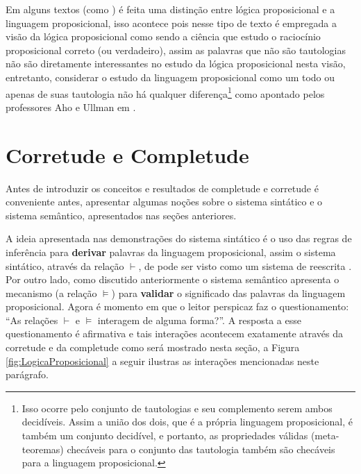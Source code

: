 Em alguns textos (como \cite{BenjaV1}) é feita uma distinção entre lógica proposicional e a linguagem proposicional, isso acontece pois nesse tipo de texto é empregada a visão da lógica proposicional como sendo a ciência que estudo o raciocínio proposicional correto (ou verdadeiro), assim as palavras que não são tautologias não são diretamente interessantes no estudo da lógica proposicional nesta visão, entretanto, considerar o estudo da linguagem proposicional como um todo ou apenas de suas tautologia não há qualquer diferença\footnote{Isso ocorre pelo conjunto de tautologias e seu complemento serem ambos decidíveis. Assim a união dos dois, que é a própria linguagem proposicional, é também um conjunto decidível, e portanto, as propriedades válidas (meta-teoremas) checáveis para o conjunto das tautologia também são checáveis para a linguagem proposicional.} como apontado pelos professores Aho e Ullman em \cite{ullman1992}.

\section{Corretude e Completude}

Antes de introduzir os conceitos e resultados de completude e corretude é conveniente antes, apresentar algumas noções sobre o sistema sintático e o sistema semântico, apresentados nas seções anteriores. 

A ideia apresentada nas demonstrações do sistema sintático é o uso das regras de inferência para \textbf{derivar} palavras da linguagem proposicional, assim o sistema sintático, através da relação $\vdash$, de pode ser visto como um sistema de reescrita \cite{ayala2014}. Por outro lado, como discutido anteriormente o sistema semântico apresenta o mecanismo (a relação $\vDash$) para \textbf{validar} o significado das palavras da linguagem proposicional. Agora é momento em que o leitor perspicaz faz o questionamento: ``As relações $\vdash$ e $\vDash$ interagem de alguma forma?''. A resposta a esse questionamento é afirmativa e tais interações acontecem exatamente através da corretude e da completude como será mostrado nesta seção, a Figura \ref{fig:LogicaProposicional} a seguir ilustras as interações mencionadas neste parágrafo.

